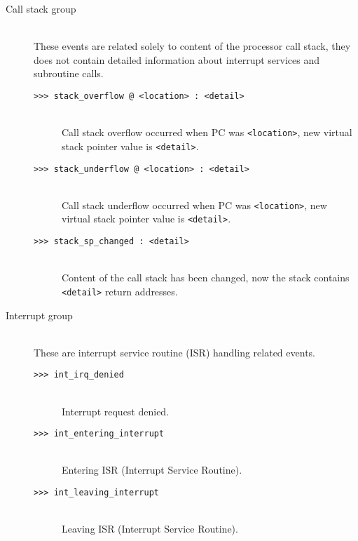 \begin{description}
            \item[Call stack group]~\\
                These events are related solely to content of the processor call stack, they does not contain detailed information about interrupt services and subroutine calls.
                \begin{description}
                    \item[\texttt{>{}>{}> stack\_overflow @ <location> : <detail>}]~\\
                        Call stack overflow occurred when PC was \texttt{<location>}, new virtual stack pointer value is \texttt{<detail>}.
                    \item[\texttt{>{}>{}> stack\_underflow @ <location> : <detail>}]~\\
                        Call stack underflow occurred when PC was \texttt{<location>}, new virtual stack pointer value is \texttt{<detail>}.
                    \item[\texttt{>{}>{}> stack\_sp\_changed : <detail>}]~\\
                        Content of the call stack has been changed, now the stack contains \texttt{<detail>} return addresses.
                \end{description}

            \item[Interrupt group]~\\
                These are interrupt service routine (ISR) handling related events.
                \begin{description}
                    \item[\texttt{>{}>{}> int\_irq\_denied}]~\\
                        Interrupt request denied.
                    \item[\texttt{>{}>{}> int\_entering\_interrupt}]~\\
                        Entering ISR (Interrupt Service Routine).
                    \item[\texttt{>{}>{}> int\_leaving\_interrupt}]~\\
                        Leaving ISR (Interrupt Service Routine).
                \end{description}


\end{description}
